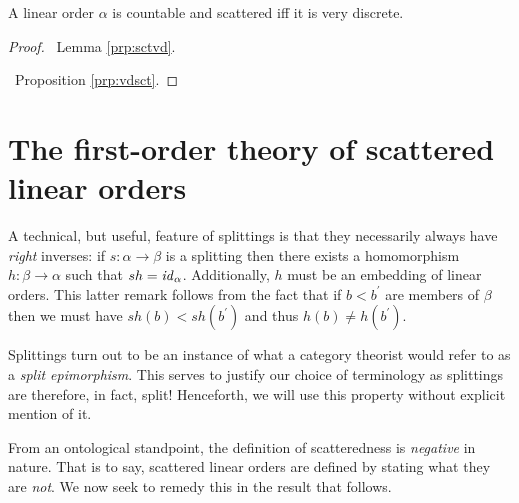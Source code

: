 \begin{thm}
	A linear order $\alpha$ is countable and scattered iff it is very discrete.
\end{thm}
\begin{proof}

	\forward\	Lemma \ref{prp:sctvd}.

	\backward\	Proposition \ref{prp:vdsct}.
\end{proof}


\section{The first-order theory of scattered linear orders}

A technical, but useful, feature of splittings is that they necessarily always
have \textit{right} inverses: if $s\colon\alpha\to\beta$ is a splitting then
there exists a homomorphism $h\colon\beta\to\alpha$ such that $sh=\mathit{id}_\alpha$.
Additionally, $h$ must be an embedding of linear orders.  This latter remark
follows from the fact that if $b<b^\prime$ are members of $\beta$ then we must
have $sh(b)<sh(b^\prime)$ and thus $h(b)\neq h(b^\prime)$.

Splittings turn out to be an instance of what a category theorist would refer to
as a \textit{split epimorphism}.  This serves to justify our choice of
terminology as splittings are therefore, in fact, split!  Henceforth, we will
use this property without explicit mention of it.

From an ontological standpoint, the definition of scatteredness is
\textit{negative} in nature.  That is to say, scattered linear orders are
defined by stating what they are \textit{not}.  We now seek to remedy this in
the result that follows.


